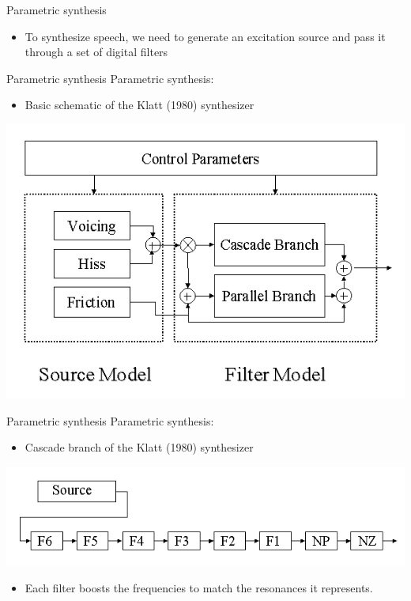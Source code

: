 \documentclass{beamer}
\begin{document}
\begin{frame}{Parametric synthesis}
\begin{itemize}
\item{To synthesize speech, we need to generate an excitation source and pass it through a set of digital filters}
\end{itemize}
\end{frame}
\begin{frame}{Parametric synthesis}
Parametric synthesis:
\begin{itemize}
\item{Basic schematic of the Klatt (1980) synthesizer}
\end{itemize}
\includegraphics[scale=0.5,keepaspectratio]{klatt.png}
\end{frame}
\begin{frame}{Parametric synthesis}
Parametric synthesis:
\begin{itemize}
\item{Cascade branch of the Klatt (1980) synthesizer}
\end{itemize}
\includegraphics[scale=0.4,keepaspectratio]{cascade.png}
\begin{itemize}
\item{Each filter boosts the frequencies to match the resonances it represents.}
\end{itemize}
\end{frame}
\end{document}
